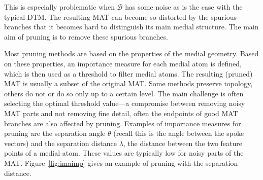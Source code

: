 This is especially problematic when $\mathcal{B}$ has some noise as is the case with the typical DTM.
The resulting MAT can become so distorted by the spurious branches that it becomes hard to distinguish its main medial structure.
The main aim of pruning is to remove these spurious branches.

Most pruning methods are based on the properties of the medial geometry. 
Based on these properties, an importance measure for each medial atom is defined, which is then used as a threshold to filter medial atoms. 
The resulting (pruned) MAT is usually a subset of the original MAT. 
Some methods preserve topology, others do not or do so only up to a certain level. 
The main challenge is often selecting the optimal threshold value---a compromise between removing noisy MAT parts and not removing fine detail, \ie often the endpoints of good MAT branches are also affected by pruning.
Examples of importance measures for pruning are the separation angle $\theta$ (recall this is the angle between the spoke vectors) and the separation distance $\lambda$, \ie the distance between the two feature points of a medial atom. 
These values are typically low for noisy parts of the MAT.
Figure~\ref{fig:imaimp} gives an example of pruning with the separation distance.
